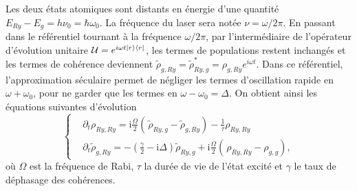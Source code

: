 Les deux états atomiques sont distants en énergie d'une quantité $E_{Ry}-E_{g} = h\nu_{0} = \hbar\omega_0$.
La fréquence du laser sera notée $\nu =\omega/ 2\pi$.
En passant dans le référentiel tournant à la fréquence $\omega/2\pi$, par l'intermédiaire de l'opérateur d'évolution unitaire $\mathcal{U} = e^{i\omega t \ket{r}\bra{r}}$, les termes de populations restent inchangés et les termes de cohérence deviennent $\tilde{\rho}_{g,Ry} = \tilde{\rho}_{Ry,g}^* =  \rho_{g,Ry}e^{i\omega t}$.
Dans ce référentiel, l'approximation séculaire permet de négliger les termes d'oscillation rapide en $\omega+\omega_0$, pour ne garder que les termes en $\omega-\omega_0 =\Delta$.
On obtient ainsi les équations suivantes d'évolution
\begin{equation}
\label{eq:Bloch_eq}
\left\{
\begin{aligned}
&\partial_t\rho_{Ry,Ry} = \mathrm{i} \frac{\Omega}{2} \left( \frac{}{}\! \tilde{\rho}_{Ry,g} - \tilde{\rho}_{g,Ry} \right) - \frac{1}{\tau}\rho_{Ry,Ry} \\
&\partial_t\tilde{\rho}_{g,Ry} =-\left( \frac{\gamma}{2} - \mathrm{i} \Delta \right) \tilde{\rho}_{Ry,g} + \mathrm{i} \frac{\Omega}{2} \left(\frac{}{}\! \rho_{Ry,Ry} - \rho_{g,g} \right),
\end{aligned}
\right.
\end{equation}
où $\Omega$ est la fréquence de Rabi, $\tau$ la durée de vie de l'état excité et $\gamma$ le taux de déphasage des cohérences.

